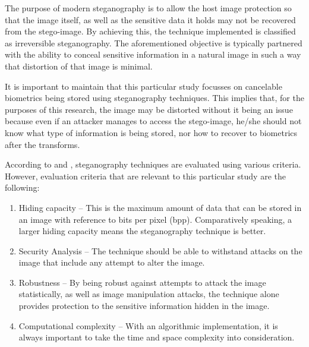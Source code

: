 The purpose of modern steganography is to allow the host image protection so that the image itself, as well as the sensitive data it holds may not be recovered from the stego-image. By achieving this, the technique implemented is classified as irreversible steganography. The aforementioned objective is typically partnered with the ability to conceal sensitive information in a natural image in such a way that distortion of that image is minimal.

It is important to maintain that this particular study focusses on cancelable biometrics being stored using steganography techniques. This implies that, for the purposes of this research, the image may be distorted without it being an issue because even if an attacker manages to access the stego-image, he/she should not know what type of information is being stored, nor how to recover to biometrics after the transforms. 

According to \cite{Jain2016} and \cite{Pradhan2016}, steganography techniques are evaluated using various criteria. However, evaluation criteria that are relevant to this particular study are the following:

\begin{enumerate}[label=\roman*.]
	
	\item Hiding capacity – This is the maximum amount of data that can be stored in an image with reference to bits per pixel (bpp). Comparatively speaking, a larger hiding capacity means the steganography technique is better.
	
	\item Security Analysis – The technique should be able to withstand attacks on the image that include any attempt to alter the image.
	
	\item Robustness – By being robust against attempts to attack the image statistically, as well as image manipulation attacks, the technique alone provides protection to the sensitive information hidden in the image. 
	
	\item Computational complexity – With an algorithmic implementation, it is always important to take the time and space complexity into consideration.

\end{enumerate}
	
